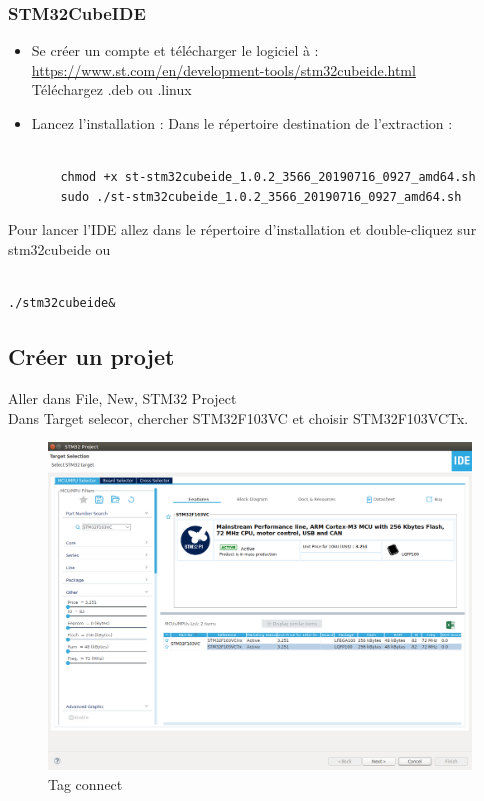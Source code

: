 \documentclass{article}
\begin{document}
\subsubsection{STM32CubeIDE}
\begin{itemize}
    \item Se créer un compte et télécharger le logiciel à : \\
\url{https://www.st.com/en/development-tools/stm32cubeide.html}\\
Téléchargez .deb ou .linux

    \item Lancez l'installation :
    Dans le répertoire destination de l'extraction : 
    \begin{verbatim}
    
    chmod +x st-stm32cubeide_1.0.2_3566_20190716_0927_amd64.sh
    sudo ./st-stm32cubeide_1.0.2_3566_20190716_0927_amd64.sh

    \end{verbatim}
\end{itemize}

Pour lancer l'IDE allez dans le répertoire d'installation et double-cliquez sur stm32cubeide ou
\begin{verbatim}

./stm32cubeide&

\end{verbatim}

\subsection{Créer un projet}

Aller dans File, New, STM32 Project \\
Dans Target selecor, chercher STM32F103VC et choisir STM32F103VCTx.
\begin{figure}[H]
\begin{center}
\advance\leftskip-3cm
\advance\rightskip-3cm
\includegraphics[keepaspectratio=true,scale=0.3]{target_selector.png}
\caption{Tag connect}
\label{visina8}
\end{center}\end{figure}
\end{document}
